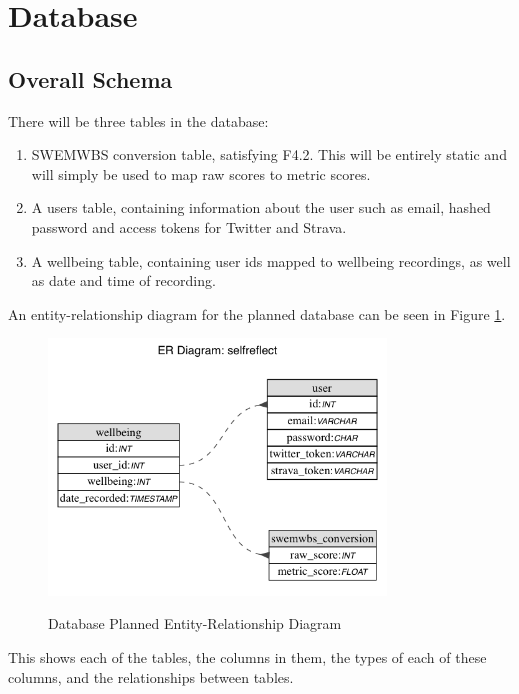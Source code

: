 \documentclass[11pt,openright,a4paper]{report}
\begin{document}
\section{Database} \label{sec:databasedesign}
\subsection{Overall Schema}
There will be three tables in the database:
\begin{enumerate}
\item SWEMWBS conversion table, satisfying F4.2. This will be entirely static and will simply be used to map raw scores to metric scores.
\item A users table, containing information about the user such as email, hashed password and access tokens for Twitter and Strava.
\item A wellbeing table, containing user ids mapped to wellbeing recordings, as well as date and time of recording.
\end{enumerate}

An entity-relationship diagram for the planned database can be seen in Figure \ref{fig:dberd}.

\begin{figure}[ht]
\centering
\caption{Database Planned Entity-Relationship Diagram}
\includegraphics[width=0.8\textwidth]{i/selfreflectdb.png}
\label{fig:dberd}
\end{figure}

This shows each of the tables, the columns in them, the types of each of these columns, and the relationships between tables.
\end{document}
